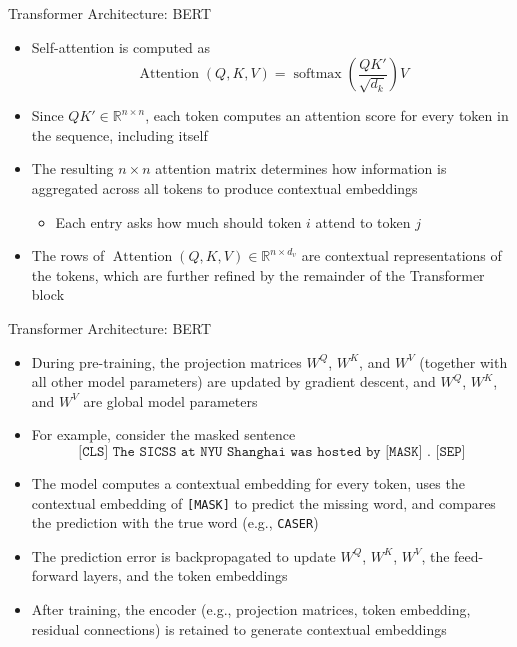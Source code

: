 \documentclass[aspectratio=1610,12pt,xcolor=dvipsnames]{beamer}
\begin{document}
\begin{frame}{Transformer Architecture: BERT}

\begin{itemize}
    \item Self-attention is computed as
    \[
    \operatorname{Attention}(Q,K,V)
    =
    \operatorname{softmax}
    \!\left(
    \frac{QK'}{\sqrt{d_k}}
    \right)V
    \]
    \item Since $QK' \in \mathds{R}^{n\times n}$, each token computes an attention score for every token in the sequence, including itself

    \item The resulting $n\times n$ attention matrix determines how information is aggregated across all tokens to produce contextual embeddings
    \begin{itemize}
        \item Each entry asks how much should token $i$ attend to token $j$
    \end{itemize}
    \item The rows of $\operatorname{Attention}(Q,K,V) \in \mathds{R}^{n \times d_v}$ are contextual representations of the tokens, which are further refined by the remainder of the Transformer block
\end{itemize}
\end{frame}

\begin{frame}{Transformer Architecture: BERT}

\begin{itemize}
    \item During pre-training, the projection matrices $W^Q$, $W^K$, and $W^V$ (together with all other model parameters) are updated by gradient descent, and $W^Q$, $W^K$, and $W^V$ are global model parameters

    \item For example, consider the masked sentence
    \[
    \texttt{[CLS] The SICSS at NYU Shanghai was hosted by [MASK] . [SEP]}
    \]

    \item The model computes a contextual embedding for every token, uses the contextual embedding of \texttt{[MASK]} to predict the missing word, and compares the prediction with the true word (e.g., \texttt{CASER})

    \item The prediction error is backpropagated to update $W^Q$, $W^K$, $W^V$, the feed-forward layers, and the token embeddings
    
    \item After training, the encoder (e.g., projection matrices, token embedding, residual connections) is retained to generate contextual embeddings
\end{itemize}
\end{frame}
\end{document}
